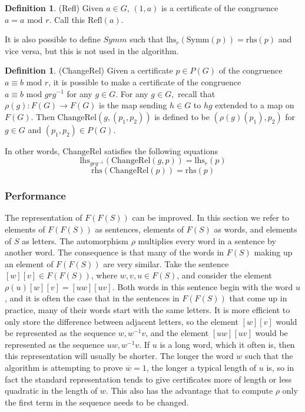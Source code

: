 \documentclass[12pt]{article} %
\theoremstyle{definition}
\theoremstyle{definition}
\theoremstyle{definition}
\theoremstyle{definition}
\newtheorem{defn}[thm]{Definition}
\begin{document}
\begin{defn}(Refl)
  Given $a \in G$, $(1, a)$ is a certificate of the congruence $a = a \text{ mod } r$. Call
  this $\text{Refl}(a)$.
\end{defn}

It is also possible to define $\textit{Symm}$ such that $\text{lhs}_r(\text{Symm}(p)) = \text{rhs}(p)$
and vice versa, but this is not used in the algorithm.

\begin{defn}(ChangeRel)
  Given a certificate $p \in P(G)$ of the congruence $a \equiv b \text{ mod } r$, it is possible
  to make a certificate of the congruence $a \equiv b \text{ mod } g r g^{-1}$ for any $g \in G$.
  For any $g \in G,$ recall that $\rho(g): F(G) \to F(G)$ is the map sending $h \in G$ to
  $hg$ extended to a map on $F(G)$.
  Then $\text{ChangeRel}(g,(p_1,p_2))$ is defined to be $(\rho(g)(p_1), p_2)$ for
  $g \in G$ and $(p_1, p_2) \in P(G)$.

  In other words, $\text{ChangeRel}$ satisfies the following equations
  \begin{equation}
    \text{lhs}_{grg^{-1}}\left(\text{ChangeRel}(g, p)\right) = \text{lhs}_r(p)
  \end{equation}
  \begin{equation}
    \text{rhs}(\text{ChangeRel}(p)) = \text{rhs}(p)
  \end{equation}
\end{defn}

\subsubsection{Performance}

The representation of $F(F(S))$ can be improved. In this section
we refer to elements of $F(F(S))$ as sentences, elements of $F(S)$ as words,
and elements of $S$ as letters.
 The automorphism $\rho$ multiplies
every word in a sentence by another word. The consequence is that many of the words in
$F(S)$ making up an element of $F(F(S))$ are very similar. Take the sentence $[w][v] \in F(F(S))$,
where $w, v, u \in F(S)$, and consider the element $\rho(u)[w][v] = [uw][uv]$. Both words
in this sentence begin with the word $u$, and it is often the case that in the sentences in $F(F(S))$
that come up in practice, many of their words start with the same letters.
It is more efficient to only store the difference between adjacent letters, so the
element $[w][v]$ would be represented as the sequence $w, w^{-1}v$, and
the element $[uw][uv]$ would be represented as the sequence $uw, w^{-1}v$.
If $u$ is a long word, which it often is, then this representation will usually be shorter.
The longer the word $w$ such that the algorithm is attempting
to prove $\overline{w} = 1$, the longer a typical length of $u$ is, so in fact
the standard representation tends to give certificates more of length or less quadratic in
the length of $w$.
This also has the advantage that to compute $\rho$ only the first term in the sequence needs
to be changed.
\end{document}

